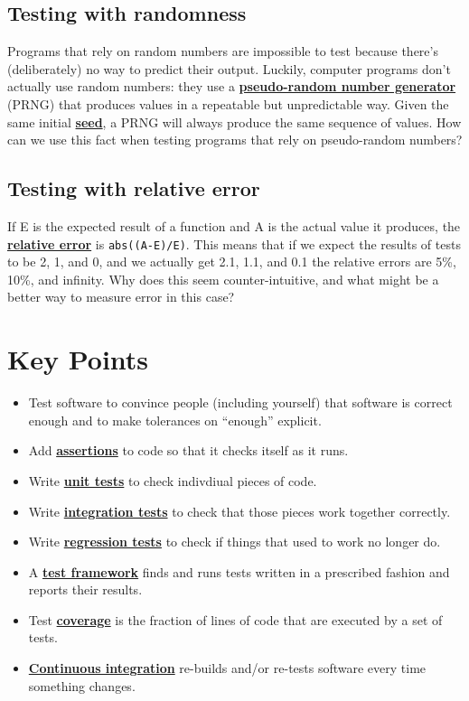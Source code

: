\documentclass[
]{krantz}
\providecommand{\tightlist}{%
  \setlength{\itemsep}{0pt}\setlength{\parskip}{0pt}}
\newcommand{\gref}[2]{\hyperlink{#2}{\textbf{#1}}}
\begin{document}
\hypertarget{testing-ex-random}{%
\subsection{Testing with randomness}\label{testing-ex-random}}

Programs that rely on random numbers are impossible to test
because there's (deliberately) no way to predict their output.
Luckily, computer programs don't actually use random numbers:
they use a \gref{pseudo-random number generator}{prng} (PRNG)
that produces values in a repeatable but unpredictable way.
Given the same initial \gref{seed}{seed},
a PRNG will always produce the same sequence of values.
How can we use this fact when testing programs that rely on pseudo-random numbers?

\hypertarget{testing-ex-relative-error}{%
\subsection{Testing with relative error}\label{testing-ex-relative-error}}

If E is the expected result of a function and A is the actual value it produces,
the \gref{relative error}{relative\_error} is \texttt{abs((A-E)/E)}.
This means that if we expect the results of tests to be 2, 1, and 0,
and we actually get 2.1, 1.1, and 0.1
the relative errors are 5\%, 10\%, and infinity.
Why does this seem counter-intuitive,
and what might be a better way to measure error in this case?

\hypertarget{testing-keypoints}{%
\section{Key Points}\label{testing-keypoints}}

\begin{itemize}
\tightlist
\item
  Test software to convince people (including yourself) that software is correct enough
  and to make tolerances on ``enough'' explicit.
\item
  Add \gref{assertions}{assertion} to code so that it checks itself as it runs.
\item
  Write \gref{unit tests}{unit\_test} to check indivdiual pieces of code.
\item
  Write \gref{integration tests}{integration\_test} to check that those pieces work together correctly.
\item
  Write \gref{regression tests}{regression\_testing} to check if things that used to work no longer do.
\item
  A \gref{test framework}{test\_framework} finds and runs tests written in a prescribed fashion and reports their results.
\item
  Test \gref{coverage}{code\_coverage} is the fraction of lines of code that are executed by a set of tests.
\item
  \gref{Continuous integration}{continuous\_integration} re-builds and/or re-tests software every time something changes.
\end{itemize}
\end{document}
